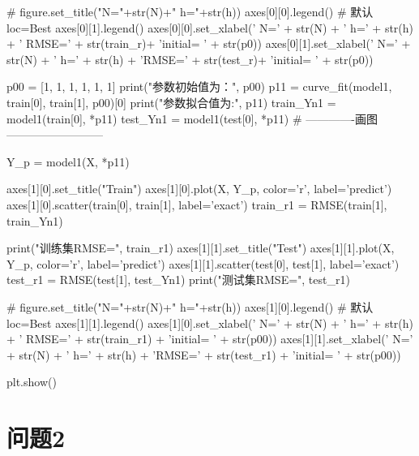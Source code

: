 \begin{python}
# figure.set_title("N="+str(N)+" h="+str(h))
axes[0][0].legend()  # 默认loc=Best
axes[0][1].legend()
axes[0][0].set_xlabel(' N=' + str(N) + ' h=' + str(h) + ' RMSE=' + str(train_r)+ '\nparameter initial= ' + str(p0))
axes[0][1].set_xlabel(' N=' + str(N) + ' h=' + str(h) + 'RMSE=' + str(test_r)+ '\nparameter initial= ' + str(p0))

p00 = [1, 1, 1, 1, 1, 1]
print("参数初始值为：", p00)
p11 = curve_fit(model1, train[0], train[1], p00)[0]
print("参数拟合值为:", p11)
train_Yn1 = model1(train[0], *p11)
test_Yn1 = model1(test[0], *p11)
# -------------画图--------------------------


Y_p = model1(X, *p11)

axes[1][0].set_title("Train")
axes[1][0].plot(X, Y_p, color='r', label='predict')
axes[1][0].scatter(train[0], train[1], label='exact')
train_r1 = RMSE(train[1], train_Yn1)

print("训练集RMSE=", train_r1)
axes[1][1].set_title("Test")
axes[1][1].plot(X, Y_p, color='r', label='predict')
axes[1][1].scatter(test[0], test[1], label='exact')
test_r1 = RMSE(test[1], test_Yn1)
print("测试集RMSE=", test_r1)

# figure.set_title("N="+str(N)+" h="+str(h))
axes[1][0].legend()  # 默认loc=Best
axes[1][1].legend()
axes[1][0].set_xlabel(' N=' + str(N) + ' h=' + str(h) + ' RMSE=' + str(train_r1) + '\nparameter initial= ' + str(p00))
axes[1][1].set_xlabel(' N=' + str(N) + ' h=' + str(h) + 'RMSE=' + str(test_r1) + '\nparameter initial= ' + str(p00))

plt.show()

\end{python}

\section{问题2}

